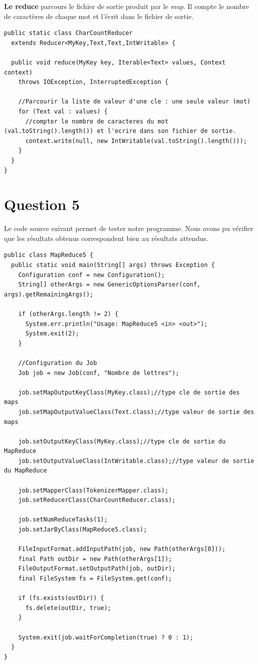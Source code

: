 \documentclass{article}
\begin{document}
    {\bf Le reduce} parcours le fichier de sortie produit par le {\it map}. Il
    compte le nombre de caractères de chaque mot et l'écrit dans le fichier de
    sortie. \medskip

\begin{lstlisting}
public static class CharCountReducer 
  extends Reducer<MyKey,Text,Text,IntWritable> {
	
  public void reduce(MyKey key, Iterable<Text> values, Context context)
    throws IOException, InterruptedException {
    		
    //Parcourir la liste de valeur d'une cle : une seule valeur (mot)
    for (Text val : values) {
      //compter le nombre de caracteres du mot (val.toString().length()) et l'ecrire dans son fichier de sortie.
      context.write(null, new IntWritable(val.toString().length()));		
    }
  }
}
\end{lstlisting}
		
  \section*{Question 5} 

    Le code source suivant permet de tester notre programme. Nous avons pu
    vérifier que les résultats obtenus correspondent bien au résultats
    attendus. \medskip

\begin{lstlisting}
public class MapReduce5 {
  public static void main(String[] args) throws Exception {
    Configuration conf = new Configuration();
    String[] otherArgs = new GenericOptionsParser(conf, args).getRemainingArgs();
		
    if (otherArgs.length != 2) {
      System.err.println("Usage: MapReduce5 <in> <out>");
      System.exit(2);
    }

    //Configuration du Job
    Job job = new Job(conf, "Nombre de lettres");
		
    job.setMapOutputKeyClass(MyKey.class);//type cle de sortie des maps
    job.setMapOutputValueClass(Text.class);//type valeur de sortie des maps		
		
    job.setOutputKeyClass(MyKey.class);//type cle de sortie du MapReduce
    job.setOutputValueClass(IntWritable.class);//type valeur de sortie du MapReduce

    job.setMapperClass(TokenizerMapper.class);
    job.setReducerClass(CharCountReducer.class);
		
    job.setNumReduceTasks(1);
    job.setJarByClass(MapReduce5.class); 		
		
    FileInputFormat.addInputPath(job, new Path(otherArgs[0]));
    final Path outDir = new Path(otherArgs[1]);
    FileOutputFormat.setOutputPath(job, outDir);
    final FileSystem fs = FileSystem.get(conf);
		
    if (fs.exists(outDir)) {
      fs.delete(outDir, true);
    }
	   
    System.exit(job.waitForCompletion(true) ? 0 : 1);
  }
}
\end{lstlisting}
\end{document}
